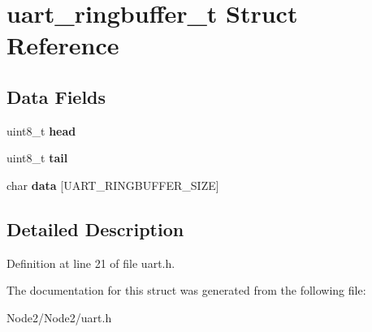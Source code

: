 \hypertarget{structuart__ringbuffer__t}{}\section{uart\+\_\+ringbuffer\+\_\+t Struct Reference}
\label{structuart__ringbuffer__t}
\subsection*{Data Fields}
\begin{DoxyCompactItemize}
\item 
\mbox{\label{structuart__ringbuffer__t_a7dd7fa4d420260e3f6f2877f5dc3b19c}} 
uint8\+\_\+t {\bfseries head}
\item 
\mbox{\label{structuart__ringbuffer__t_ae05eece4d220073e4716fbd8497210ea}} 
uint8\+\_\+t {\bfseries tail}
\item 
\mbox{\label{structuart__ringbuffer__t_a036b2ac125481cf61db7f749a1a2f11a}} 
char {\bfseries data} \mbox{[}U\+A\+R\+T\+\_\+\+R\+I\+N\+G\+B\+U\+F\+F\+E\+R\+\_\+\+S\+I\+ZE\mbox{]}
\end{DoxyCompactItemize}


\subsection{Detailed Description}


Definition at line 21 of file uart.\+h.



The documentation for this struct was generated from the following file\+:\begin{DoxyCompactItemize}
\item 
Node2/\+Node2/uart.\+h\end{DoxyCompactItemize}
